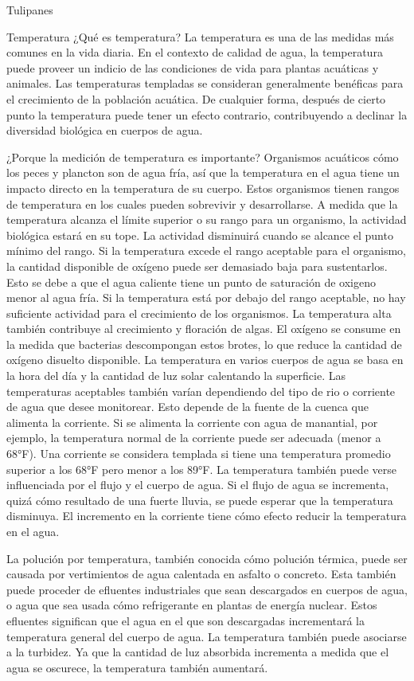 Tulipanes


Temperatura
¿Qué es temperatura?
La temperatura es una de las medidas más comunes en la vida diaria. En el contexto de calidad de agua, la temperatura puede proveer un indicio de las condiciones de vida para plantas acuáticas y animales.  Las temperaturas templadas se consideran generalmente benéficas para el crecimiento de la población acuática. De cualquier forma, después de cierto punto la temperatura puede tener un efecto contrario, contribuyendo a declinar la diversidad biológica en cuerpos de agua.

¿Porque la medición de temperatura es importante?
Organismos acuáticos cómo los peces y plancton son de agua fría, así que la temperatura en el agua tiene un impacto directo en la temperatura de su cuerpo. Estos organismos tienen rangos de temperatura en los cuales pueden sobrevivir y desarrollarse. A medida que la temperatura alcanza el límite superior o su rango para un organismo, la actividad biológica estará en su tope. La actividad disminuirá cuando se alcance el punto mínimo del rango. Si la temperatura excede el rango aceptable para el organismo, la cantidad disponible de oxígeno puede ser demasiado baja para sustentarlos. Esto se debe a que el agua caliente tiene un punto de saturación de oxigeno menor al agua fría. Si la temperatura está por debajo del rango aceptable, no hay suficiente actividad para el crecimiento de los organismos. La temperatura alta también contribuye al crecimiento y floración de algas. El oxígeno se consume en la medida que bacterias descompongan estos brotes, lo que reduce la cantidad de oxígeno disuelto disponible.
La temperatura en varios cuerpos de agua se basa en la hora del día y la cantidad de luz solar calentando la superficie. Las temperaturas aceptables también varían dependiendo del tipo de rio o corriente de agua que desee monitorear. Esto depende de la fuente de la cuenca que alimenta la corriente. Si se alimenta la corriente con agua de manantial, por ejemplo, la temperatura normal de la corriente puede ser adecuada (menor a 68°F). Una corriente se considera templada si tiene una temperatura promedio superior a los 68°F pero menor a los 89°F. La temperatura también puede verse influenciada por el flujo y el cuerpo de agua. Si el flujo de agua se incrementa, quizá cómo resultado de una fuerte lluvia, se puede esperar que la temperatura disminuya. El incremento en la corriente tiene cómo efecto reducir la temperatura en el agua.

La polución por temperatura, también conocida cómo polución térmica, puede ser causada por vertimientos de agua calentada en asfalto o concreto. Esta también puede proceder de efluentes industriales que sean descargados en cuerpos de agua, o agua que sea usada cómo refrigerante en plantas de energía nuclear. Estos efluentes significan que el agua en el que son descargadas incrementará la temperatura general del cuerpo de agua.  La temperatura también puede asociarse a la turbidez.  Ya que la cantidad de luz absorbida incrementa a medida que el agua se oscurece, la temperatura también aumentará.

